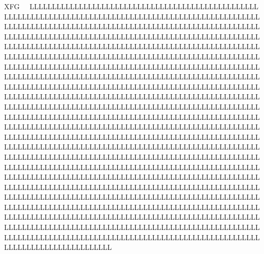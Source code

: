 XFG                        LLL LLL LLL LLL LLL LLL LLL LLL LLL LLL LLL LLL LLL LLL LLL LLL LLL LLL LLL LLL LLL LLL LLL LLL LLL LLL LLL LLL LLL LLL LLL LLL LLL LLL LLL LLL LLL LLL LLL LLL LLL LLL LLL LLL LLL LLL LLL LLL LLL LLL LLL LLL LLL LLL LLL LLL LLL LLL LLL LLL LLL LLL LLL LLL LLL LLL LLL LLL LLL LLL LLL LLL LLL LLL LLL LLL LLL LLL LLL LLL LLL LLL LLL LLL LLL LLL LLL LLL LLL LLL LLL LLL LLL LLL LLL LLL LLL LLL LLL LLL LLL LLL LLL LLL LLL LLL LLL LLL LLL LLL LLL LLL LLL LLL LLL LLL LLL LLL LLL LLL LLL LLL LLL LLL LLL LLL LLL LLL LLL LLL LLL LLL LLL LLL LLL LLL LLL LLL LLL LLL LLL LLL LLL LLL LLL LLL LLL LLL LLL LLL LLL LLL LLL LLL LLL LLL LLL LLL LLL LLL LLL LLL LLL LLL LLL LLL LLL LLL LLL LLL LLL LLL LLL LLL LLL LLL LLL LLL LLL LLL LLL LLL LLL LLL LLL LLL LLL LLL LLL LLL LLL LLL LLL LLL LLL LLL LLL LLL LLL LLL LLL LLL LLL LLL LLL LLL LLL LLL LLL LLL LLL LLL LLL LLL LLL LLL LLL LLL LLL LLL LLL LLL LLL LLL LLL LLL LLL LLL LLL LLL LLL LLL LLL LLL LLL LLL LLL LLL LLL LLL LLL LLL LLL LLL LLL LLL LLL LLL LLL LLL LLL LLL LLL LLL LLL LLL LLL LLL LLL LLL LLL LLL LLL LLL LLL LLL LLL LLL LLL LLL LLL LLL LLL LLL LLL LLL LLL LLL LLL LLL LLL LLL LLL LLL LLL LLL LLL LLL LLL LLL LLL LLL LLL LLL LLL LLL LLL LLL LLL LLL LLL LLL LLL LLL LLL LLL LLL LLL LLL LLL LLL LLL LLL LLL LLL LLL LLL LLL LLL LLL LLL LLL LLL LLL LLL LLL LLL LLL LLL LLL LLL LLL LLL LLL LLL LLL LLL LLL LLL LLL LLL LLL LLL LLL LLL LLL LLL LLL LLL LLL LLL LLL LLL LLL LLL LLL LLL LLL LLL LLL LLL LLL LLL LLL LLL LLL LLL LLL LLL LLL LLL LLL LLL LLL LLL LLL LLL LLL LLL LLL LLL LLL LLL LLL LLL LLL LLL LLL LLL LLL LLL LLL LLL LLL LLL LLL LLL LLL LLL LLL LLL LLL LLL LLL LLL LLL LLL LLL LLL LLL LLL LLL LLL LLL LLL LLL LLL LLL LLL LLL LLL LLL LLL LLL LLL LLL LLL LLL LLL LLL LLL LLL LLL LLL LLL LLL LLL LLL LLL LLL LLL LLL LLL LLL LLL LLL LLL LLL LLL LLL LLL LLL LLL LLL LLL LLL LLL LLL LLL LLL LLL LLL 